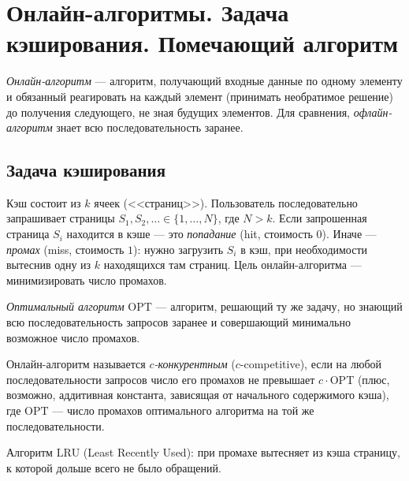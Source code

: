 
\section{Онлайн-алгоритмы. Задача кэширования. Помечающий алгоритм}

\begin{Definition}{}{}
	\emph{Онлайн-алгоритм} --- алгоритм, получающий входные данные по одному элементу и обязанный реагировать на каждый элемент (принимать необратимое решение) до получения следующего, не зная будущих элементов. Для сравнения, \emph{офлайн-алгоритм} знает всю последовательность заранее.
\end{Definition}

\subsection{Задача кэширования}

\begin{Definition}{}{}
	Кэш состоит из $k$ ячеек (<<страниц>>). Пользователь последовательно запрашивает страницы $S_1, S_2, \ldots \in \{1,\ldots,N\}$, где $N > k$. Если запрошенная страница $S_i$ находится в кэше --- это \emph{попадание} (hit, стоимость $0$). Иначе --- \emph{промах} (miss, стоимость $1$): нужно загрузить $S_i$ в кэш, при необходимости вытеснив одну из $k$ находящихся там страниц. Цель онлайн-алгоритма --- минимизировать число промахов.
\end{Definition}

\begin{Definition}{}{}
	\emph{Оптимальный алгоритм} $\mathrm{OPT}$ --- алгоритм, решающий ту же задачу, но знающий всю последовательность запросов заранее и совершающий минимально возможное число промахов.
\end{Definition}

\begin{Definition}{}{}
	Онлайн-алгоритм называется \emph{$c$-конкурентным} ($c$-competitive), если на любой последовательности запросов число его промахов не превышает $c \cdot \mathrm{OPT}$ (плюс, возможно, аддитивная константа, зависящая от начального содержимого кэша), где $\mathrm{OPT}$ --- число промахов оптимального алгоритма на той же последовательности.
\end{Definition}

\begin{Definition}{}{}
	Алгоритм $\mathrm{LRU}$ (Least Recently Used): при промахе вытесняет из кэша страницу, к которой дольше всего не было обращений.
\end{Definition}

